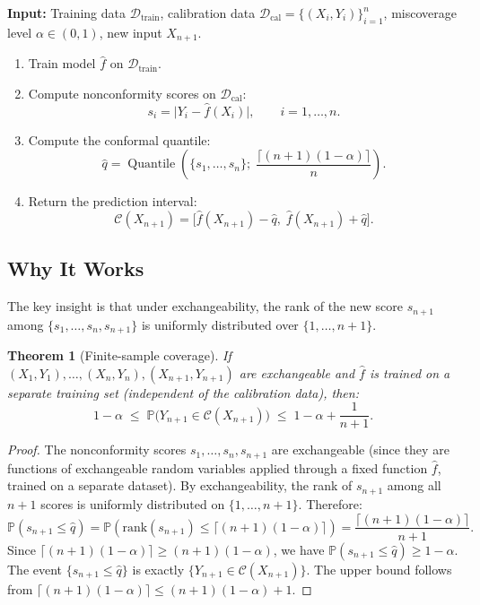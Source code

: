 \documentclass[11pt, a4paper]{article}
\theoremstyle{definition}
\theoremstyle{plain}
\newtheorem{theorem}{Theorem}[section]
\theoremstyle{remark}
\newcommand{\PV}{\mathbb{P}}
\newcommand{\Ccal}{\mathcal{C}}
\newcommand{\Dcal}{\mathcal{D}}
\DeclareMathOperator{\Quantile}{Quantile}
\begin{document}
\begin{algorithmbox}[title={Algorithm 1: Split Conformal Prediction}]
\label{alg:split-conformal}
\textbf{Input:} Training data $\Dcal_{\mathrm{train}}$, calibration data
$\Dcal_{\mathrm{cal}} = \{(X_i, Y_i)\}_{i=1}^{n}$,
miscoverage level $\alpha \in (0,1)$, new input $X_{n+1}$.
\begin{enumerate}
    \item Train model $\hat{f}$ on $\Dcal_{\mathrm{train}}$.
    \item Compute nonconformity scores on $\Dcal_{\mathrm{cal}}$:
    \[
        s_i = \bigl|Y_i - \hat{f}(X_i)\bigr|, \qquad i = 1, \ldots, n.
    \]
    \item Compute the conformal quantile:
    \[
        \hat{q} = \Quantile\!\left(\{s_1, \ldots, s_n\};\;
        \frac{\lceil (n+1)(1-\alpha) \rceil}{n}\right).
    \]
    \item Return the prediction interval:
    \[
        \Ccal(X_{n+1}) = \bigl[\hat{f}(X_{n+1}) - \hat{q},\;
        \hat{f}(X_{n+1}) + \hat{q}\bigr].
    \]
\end{enumerate}
\end{algorithmbox}

\subsection{Why It Works}

The key insight is that under exchangeability, the rank of the new score $s_{n+1}$
among $\{s_1, \ldots, s_n, s_{n+1}\}$ is uniformly distributed over
$\{1, \ldots, n+1\}$.

\begin{theorem}[Finite-sample coverage]\label{thm:coverage-formal}
If $(X_1, Y_1), \ldots, (X_n, Y_n), (X_{n+1}, Y_{n+1})$ are exchangeable and
$\hat{f}$ is trained on a separate training set (independent of the calibration
data), then:
\begin{equation}\label{eq:coverage-formal}
    1 - \alpha \;\leq\; \PV\bigl(Y_{n+1} \in \Ccal(X_{n+1})\bigr)
    \;\leq\; 1 - \alpha + \frac{1}{n+1}.
\end{equation}
\end{theorem}

\begin{proof}
The nonconformity scores $s_1, \ldots, s_n, s_{n+1}$ are exchangeable
(since they are functions of exchangeable random variables applied through a
fixed function $\hat{f}$, trained on a separate dataset).
By exchangeability, the rank of $s_{n+1}$ among all $n+1$ scores is uniformly
distributed on $\{1, \ldots, n+1\}$.
Therefore:
\[
    \PV(s_{n+1} \leq \hat{q})
    = \PV\!\left(\mathrm{rank}(s_{n+1}) \leq
      \lceil (n+1)(1-\alpha) \rceil\right)
    = \frac{\lceil (n+1)(1-\alpha) \rceil}{n+1}.
\]
Since $\lceil (n+1)(1-\alpha) \rceil \geq (n+1)(1-\alpha)$, we have
$\PV(s_{n+1} \leq \hat{q}) \geq 1 - \alpha$.
The event $\{s_{n+1} \leq \hat{q}\}$ is exactly
$\{Y_{n+1} \in \Ccal(X_{n+1})\}$.
The upper bound follows from
$\lceil (n+1)(1-\alpha) \rceil \leq (n+1)(1-\alpha) + 1$.
\end{proof}
\end{document}
